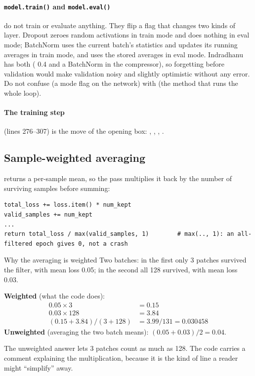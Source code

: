 \paragraph{\texttt{model.train()} and \texttt{model.eval()}} do not train or evaluate anything.
They flip a flag that changes two kinds of layer. Dropout zeroes random activations in train
mode and does nothing in eval mode; BatchNorm uses the current batch's statistics and updates
its running averages in train mode, and uses the stored averages in eval mode. Indradhanu has
both ( 0.4 and a BatchNorm in the compressor), so forgetting  before
validation would make validation noisy and slightly optimistic without any error. Do not
confuse  (a mode flag on the network) with  (the
method that runs the whole loop).

\paragraph{The training step} (lines 276--307) is the move of the opening box:
, , ,
.

\subsection{Sample-weighted averaging}

 returns a per-sample mean, so the pass multiplies it back by the number of
surviving samples before summing:
\begin{lstlisting}
total_loss += loss.item() * num_kept
valid_samples += num_kept
...
return total_loss / max(valid_samples, 1)        # max(.., 1): an all-filtered epoch gives 0, not a crash
\end{lstlisting}

\begin{worked}[label={we:trainloop:weighted}]{Why the averaging is weighted}
Two batches: in the first only 3 patches survived the filter, with mean loss 0.05; in the
second all 128 survived, with mean loss 0.03.

\textbf{Weighted} (what the code does):
\begin{align*}
0.05 \times 3 &= 0.15\\
0.03 \times 128 &= 3.84\\
(0.15 + 3.84)/(3 + 128) &= 3.99/131 = 0.030458
\end{align*}
\textbf{Unweighted} (averaging the two batch means): $(0.05 + 0.03)/2 = 0.04$.

The unweighted answer lets 3 patches count as much as 128. The code carries a comment
explaining the multiplication, because it is the kind of line a reader might ``simplify'' away.
\end{worked}

